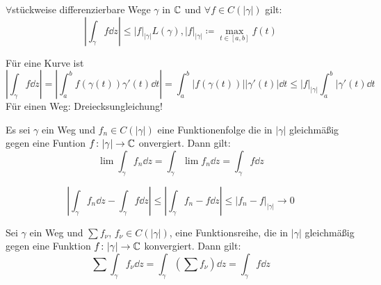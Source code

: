 \begin{satz}
	$ \forall $st\"uckweise differenzierbare Wege $ \gamma $ in $ \mathbb{C} $ und $ \forall f\in C(|\gamma|) $ gilt:
	\[ \left|\int_{\gamma}^{}f\dd z\right|\leq |f|_{|\gamma|}L(\gamma), |f|_{|\gamma|}\coloneqq\max_{t\in[a,b]}f(t) \]
\end{satz}
\begin{beweis}
	F\"ur eine Kurve ist
	\[ \left|\int_{\gamma}^{}f\dd z\right|=\left|\int_a^b f(\gamma(t))\gamma'(t)\dd t\right|=\int_a^b|f(\gamma(t))||\gamma'(t)|\dd t\leq|f|_{|\gamma|}\int_a^b|\gamma'(t)\dd t \]
	F\"ur einen Weg: Dreiecksungleichung!
\end{beweis}
\begin{satz}
	Es sei $ \gamma $ ein Weg und $ f_n\in C(|\gamma|) $ eine Funktionenfolge die in $ |\gamma| $ gleichm\"a\ss ig gegen eine Funtion $ f\colon |\gamma|\rightarrow\mathbb{C} $ onvergiert. Dann gilt:
	\[ \lim\int_{\gamma}^{}f_n\dd z=\int_{\gamma}^{}\lim f_n\dd z=\int_{\gamma}^{}f\dd z \]
\end{satz}
\begin{beweis}
	\[ \left|\int_{\gamma}^{}f_n\dd z-\int_{\gamma}^{}f\dd z\right|\leq\left|\int_{\gamma}^{}f_n-f\dd z\right|\leq|f_n-f|_{|\gamma|}\rightarrow 0 \]
\end{beweis}
\begin{satz}
	Sei $ \gamma $ ein Weg und $ \sum f_\nu $, $ f_\nu\in C(|\gamma|) $, eine Funktionsreihe, die in $ |\gamma| $ gleichm\"a\ss ig gegen eine Funktion $ f\colon |\gamma|\rightarrow\mathbb{C} $ konvergiert. Dann gilt:
	\[ \sum\int_{\gamma}^{} f_\nu\dd z=\int_{\gamma}^{}\left(\sum f_\nu\right)\dd z=\int_{\gamma}^{} f\dd z \]
\end{satz}

